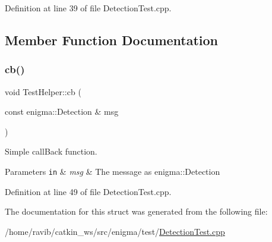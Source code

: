 Definition at line 39 of file Detection\+Test.\+cpp.



\subsection{Member Function Documentation}
\mbox{\label{struct_test_helper_a62f1c37b402ca6eb912585d8086ab32a}} 
\subsubsection{\texorpdfstring{cb()}{cb()}}
{\footnotesize\ttfamily void Test\+Helper\+::cb (\begin{DoxyParamCaption}\item[{const enigma\+::\+Detection \&}]{msg }\end{DoxyParamCaption})\hspace{0.3cm}{\ttfamily [inline]}}



Simple call\+Back function. 


\begin{DoxyParams}[1]{Parameters}
\mbox{\tt in}  & {\em msg} & The message as enigma\+::\+Detection \\
\hline
\end{DoxyParams}


Definition at line 49 of file Detection\+Test.\+cpp.



The documentation for this struct was generated from the following file\+:\begin{DoxyCompactItemize}
\item 
/home/ravib/catkin\+\_\+ws/src/enigma/test/\hyperlink{_detection_test_8cpp}{Detection\+Test.\+cpp}\end{DoxyCompactItemize}
